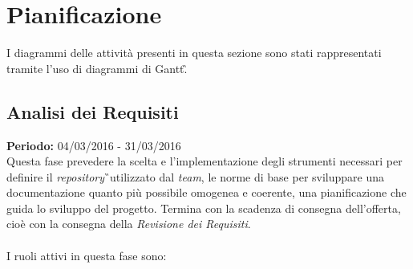 \section{Pianificazione}
I diagrammi delle attività presenti in questa sezione sono stati rappresentati 
tramite l'uso di diagrammi di Gantt\G.

\subsection{Analisi dei Requisiti}
\textbf{Periodo:} 04/03/2016 - 31/03/2016\\
Questa fase prevedere la scelta e l'implementazione degli strumenti necessari 
per definire il \textit{repository}\G\ utilizzato dal \textit{team}, le 
norme di base per sviluppare una documentazione quanto più possibile omogenea e 
coerente, una pianificazione che guida lo sviluppo del progetto. Termina con 
la scadenza di consegna dell'offerta, cioè con la consegna della 
\textit{Revisione dei Requisiti}.\\\\
I ruoli attivi in questa fase sono:

